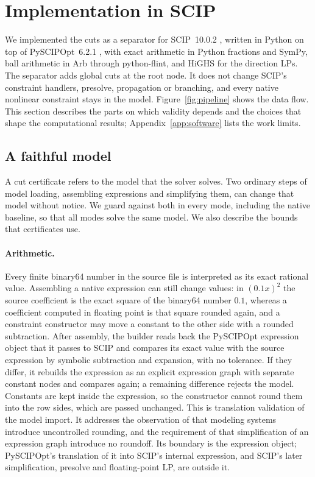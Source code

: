 \section{Implementation in SCIP}\label{sec:implementation}

We implemented the cuts as a separator for SCIP~10.0.2 \citep{SCIP10},
written in Python on top of PySCIPOpt~6.2.1 \citep{PySCIPOpt}, with exact
arithmetic in Python fractions and SymPy, ball arithmetic in Arb through
python-flint, and HiGHS \citep{HuangfuHall2018} for the direction LPs. The separator adds global cuts
at the root node. It does not change SCIP's constraint handlers, presolve,
propagation or branching, and every native nonlinear constraint stays in the
model. Figure~\ref{fig:pipeline} shows the data flow. This section describes
the parts on which validity depends and the choices that shape the
computational results; Appendix~\ref{app:software} lists the work limits.



\subsection{A faithful model}\label{sec:faithful}

A cut certificate refers to the model that the solver solves. Two ordinary
steps of model loading, assembling expressions and simplifying them, can
change that model without notice. We guard against both in every mode,
including the native baseline, so that all modes solve the same model. We
also describe the bounds that certificates use.

\paragraph{Arithmetic.}
Every finite binary64 number in the source file is interpreted as its exact
rational value. Assembling a native expression can still change values: in
$(0.1x)^2$ the source coefficient is the exact square of the binary64 number
$0.1$, whereas a coefficient computed in floating point is that square
rounded again, and a constraint constructor may move a constant to the other
side with a rounded subtraction. After assembly, the builder reads back the
PySCIPOpt expression object that it passes to SCIP and compares its exact
value with the source expression by symbolic subtraction and expansion, with
no tolerance. If they differ, it rebuilds the expression as an explicit
expression graph with separate constant nodes and compares again; a remaining
difference rejects the model. Constants are kept inside the expression, so
the constructor cannot round them into the row sides, which are passed
unchanged. This is translation validation
\citep{PnueliSiegelSingerman1998,Necula2000} of the model import. It
addresses the observation of \citet[Section~20]{Neumaier2004} that modeling
systems introduce uncontrolled rounding, and the requirement of
\citet[Section~3.1]{SchichlNeumaier2005} that simplification of an expression
graph introduce no roundoff. Its boundary is the expression object;
PySCIPOpt's translation of it into SCIP's internal expression, and SCIP's
later simplification, presolve and floating-point LP, are outside it.

